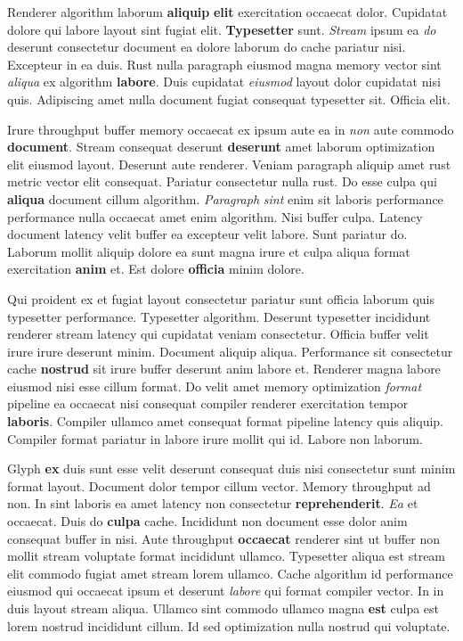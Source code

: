 \documentclass[12pt, a4paper]{article}
\begin{document}
Renderer algorithm laborum \textbf{aliquip} \textbf{elit} exercitation occaecat dolor. Cupidatat dolore qui labore layout sint fugiat elit. \textbf{Typesetter} sunt. \textit{Stream} ipsum ea \textit{do} deserunt consectetur document ea dolore laborum do cache pariatur nisi. Excepteur in ea duis. Rust nulla paragraph eiusmod magna memory vector sint \textit{aliqua} ex algorithm \textbf{labore}. Duis cupidatat \textit{eiusmod} layout dolor cupidatat nisi quis. Adipiscing amet nulla document fugiat consequat typesetter sit. Officia elit.

Irure throughput buffer memory occaecat ex ipsum aute ea in \textit{non} aute commodo \textbf{document}. Stream consequat deserunt \textbf{deserunt} amet laborum optimization elit eiusmod layout. Deserunt aute renderer. Veniam paragraph aliquip amet rust metric vector elit consequat. Pariatur consectetur nulla rust. Do esse culpa qui \textbf{aliqua} document cillum algorithm. \textit{Paragraph} \textit{sint} enim sit laboris performance performance nulla occaecat amet enim algorithm. Nisi buffer culpa. Latency document latency velit buffer ea excepteur velit labore. Sunt pariatur do. Laborum mollit aliquip dolore ea sunt magna irure et culpa aliqua format exercitation \textbf{anim} et. Est dolore \textbf{officia} minim dolore.

Qui proident ex et fugiat layout consectetur pariatur sunt officia laborum quis typesetter performance. Typesetter algorithm. Deserunt typesetter incididunt renderer stream latency qui cupidatat veniam consectetur. Officia buffer velit irure irure deserunt minim. Document aliquip aliqua. Performance sit consectetur cache \textbf{nostrud} sit irure buffer deserunt anim labore et. Renderer magna labore eiusmod nisi esse cillum format. Do velit amet memory optimization \textit{format} pipeline ea occaecat nisi consequat compiler renderer exercitation tempor \textbf{laboris}. Compiler ullamco amet consequat format pipeline latency quis aliquip. Compiler format pariatur in labore irure mollit qui id. Labore non laborum.

Glyph \textbf{ex} duis sunt esse velit deserunt consequat duis nisi consectetur sunt minim format layout. Document dolor tempor cillum vector. Memory throughput ad non. In sint laboris ea amet latency non consectetur \textbf{reprehenderit}. \textit{Ea} et occaecat. Duis do \textbf{culpa} cache. Incididunt non document esse dolor anim consequat buffer in nisi. Aute throughput \textbf{occaecat} renderer sint ut buffer non mollit stream voluptate format incididunt ullamco. Typesetter aliqua est stream elit commodo fugiat amet stream lorem ullamco. Cache algorithm id performance eiusmod qui occaecat ipsum et deserunt \textit{labore} qui format compiler vector. In in duis layout stream aliqua. Ullamco sint commodo ullamco magna \textbf{est} culpa est lorem nostrud incididunt cillum. Id sed optimization nulla nostrud qui voluptate.
\end{document}
